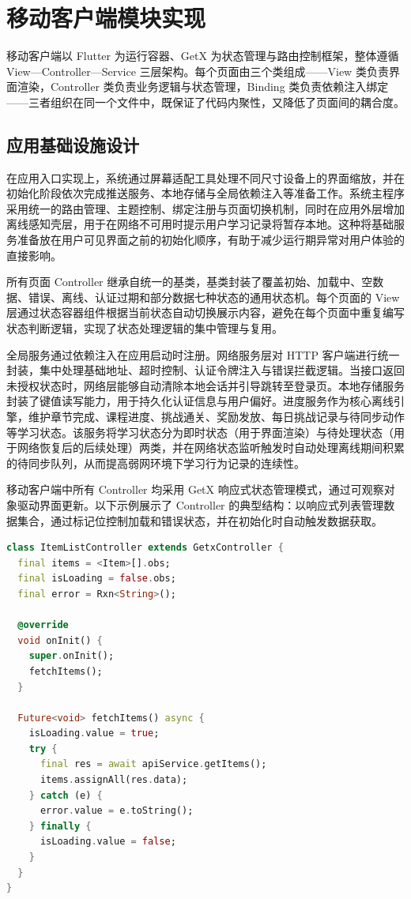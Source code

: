 \section{移动客户端模块实现}

移动客户端以 Flutter 为运行容器、GetX 为状态管理与路由控制框架，整体遵循 View—Controller—Service 三层架构。每个页面由三个类组成——View 类负责界面渲染，Controller 类负责业务逻辑与状态管理，Binding 类负责依赖注入绑定——三者组织在同一个文件中，既保证了代码内聚性，又降低了页面间的耦合度。

\subsection{应用基础设施设计}

在应用入口实现上，系统通过屏幕适配工具处理不同尺寸设备上的界面缩放，并在初始化阶段依次完成推送服务、本地存储与全局依赖注入等准备工作。系统主程序采用统一的路由管理、主题控制、绑定注册与页面切换机制，同时在应用外层增加离线感知壳层，用于在网络不可用时提示用户学习记录将暂存本地。这种将基础服务准备放在用户可见界面之前的初始化顺序，有助于减少运行期异常对用户体验的直接影响。

所有页面 Controller 继承自统一的基类，基类封装了覆盖初始、加载中、空数据、错误、离线、认证过期和部分数据七种状态的通用状态机。每个页面的 View 层通过状态容器组件根据当前状态自动切换展示内容，避免在每个页面中重复编写状态判断逻辑，实现了状态处理逻辑的集中管理与复用。

全局服务通过依赖注入在应用启动时注册。网络服务层对 HTTP 客户端进行统一封装，集中处理基础地址、超时控制、认证令牌注入与错误拦截逻辑。当接口返回未授权状态时，网络层能够自动清除本地会话并引导跳转至登录页。本地存储服务封装了键值读写能力，用于持久化认证信息与用户偏好。进度服务作为核心离线引擎，维护章节完成、课程进度、挑战通关、奖励发放、每日挑战记录与待同步动作等学习状态。该服务将学习状态分为即时状态（用于界面渲染）与待处理状态（用于网络恢复后的后续处理）两类，并在网络状态监听触发时自动处理离线期间积累的待同步队列，从而提高弱网环境下学习行为记录的连续性。

移动客户端中所有 Controller 均采用 GetX 响应式状态管理模式，通过可观察对象驱动界面更新。以下示例展示了 Controller 的典型结构：以响应式列表管理数据集合，通过标记位控制加载和错误状态，并在初始化时自动触发数据获取。

\begin{lstlisting}[language=Dart, caption={GetX 响应式控制器示例}, label={lst:getx-controller}]
class ItemListController extends GetxController {
  final items = <Item>[].obs;
  final isLoading = false.obs;
  final error = Rxn<String>();

  @override
  void onInit() {
    super.onInit();
    fetchItems();
  }

  Future<void> fetchItems() async {
    isLoading.value = true;
    try {
      final res = await apiService.getItems();
      items.assignAll(res.data);
    } catch (e) {
      error.value = e.toString();
    } finally {
      isLoading.value = false;
    }
  }
}
\end{lstlisting}

